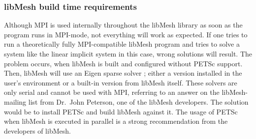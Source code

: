  
  \subsubsection{libMesh build time requirements}\label{sec:Impl-Parallel-Requirements}
   Although MPI is used internally throughout the libMesh library as soon as the program runs in MPI-mode, not everything will work as expected. If one tries to run a theoretically fully MPI-compatible libMesh program and tries to solve a system like the linear implicit system in this case, wrong solutions will result. The problem occurs, when libMesh is built and configured without PETSc support. Then, libMesh will use an Eigen sparse solver \cite{eigen-url}; either a version installed in the user's environment or a built-in version from libMesh itself. These solvers are only serial and cannot be used with MPI, referring to an answer on the libMesh-mailing list from Dr.\ John Peterson, one of the libMesh developers. The solution would be to install PETSc and build libMesh against it. The usage of PETSc when libMesh is executed in parallel is a strong recommendation from the developers of libMesh.
 
 
 
